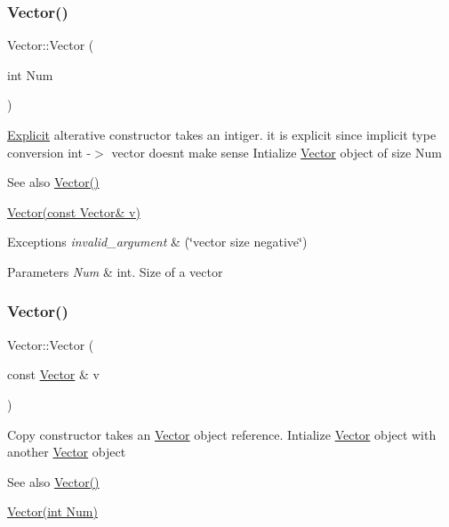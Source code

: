 \subsubsection{\texorpdfstring{Vector()}{Vector()}\hspace{0.1cm}{\footnotesize\ttfamily [2/3]}}
{\footnotesize\ttfamily Vector\+::\+Vector (\begin{DoxyParamCaption}\item[{int}]{Num }\end{DoxyParamCaption})\hspace{0.3cm}{\ttfamily [explicit]}}

\hyperlink{class_explicit}{Explicit} alterative constructor takes an intiger. it is explicit since implicit type conversion int -\/$>$ vector doesn\textquotesingle{}t make sense Intialize \hyperlink{class_vector}{Vector} object of size Num \begin{DoxySeeAlso}{See also}
\hyperlink{class_vector_a6f80c73b5f18dcf3f8e36065bdc8b9e5}{Vector()} 

\hyperlink{class_vector_a5f04e343b7306ad11f8a82c89b486764}{Vector(const Vector\& v)} 
\end{DoxySeeAlso}

\begin{DoxyExceptions}{Exceptions}
{\em invalid\+\_\+argument} & (\char`\"{}vector size negative\char`\"{}) \\
\hline
\end{DoxyExceptions}

\begin{DoxyParams}{Parameters}
{\em Num} & int. Size of a vector \\
\hline
\end{DoxyParams}
\mbox{\label{class_vector_a5f04e343b7306ad11f8a82c89b486764}} 
\subsubsection{\texorpdfstring{Vector()}{Vector()}\hspace{0.1cm}{\footnotesize\ttfamily [3/3]}}
{\footnotesize\ttfamily Vector\+::\+Vector (\begin{DoxyParamCaption}\item[{const \hyperlink{class_vector}{Vector} \&}]{v }\end{DoxyParamCaption})}

Copy constructor takes an \hyperlink{class_vector}{Vector} object reference. Intialize \hyperlink{class_vector}{Vector} object with another \hyperlink{class_vector}{Vector} object \begin{DoxySeeAlso}{See also}
\hyperlink{class_vector_a6f80c73b5f18dcf3f8e36065bdc8b9e5}{Vector()} 

\hyperlink{class_vector_acbdf66550f2caa0a64e0b356fb63a277}{Vector(int Num)} 
\end{DoxySeeAlso}


